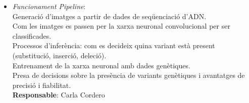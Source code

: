 \documentclass[a4paper]{article}
\begin{document}
\begin{table}[ht]
\begin{itemize}
		\item \emph{Funcionament Pipeline}:\\
			Generació d'imatges a partir de dades de seqüenciació d'ADN.\\
			Com les imatges es passen per la xarxa neuronal convolucional per ser classificades.\\
			Processos d'inferència: com es decideix quina variant està present (substitució, inserció, deleció).\\
			Entrenament de la xarxa neuronal amb dades genètiques.\\
			Presa de decisions sobre la presència de variants genètiques i avantatges de precisió i fiabilitat.\\
			\textbf{Responsable}: Carla Cordero\\
	\end{itemize}
	
	
	

\end{table}
\end{document}
